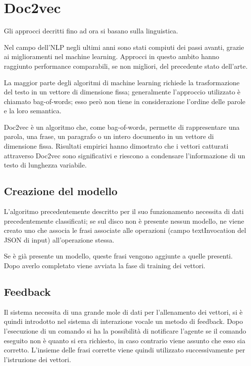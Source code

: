\documentclass[twoside]{supsistudent}
\begin{document}
\section{Doc2vec}
Gli approcci decritti fino ad ora si basano sulla linguistica.

Nel campo dell'NLP negli ultimi anni sono stati compiuti dei passi avanti, grazie ai miglioramenti nel machine learning. Approcci in questo ambito hanno raggiunto performance comparabili, se non migliori, del precedente stato dell'arte. 

La maggior parte degli algoritmi di machine learning richiede la trasformazione del testo in un vettore di dimensione fissa; generalmente l'approccio utilizzato è chiamato bag-of-words; esso però non tiene in considerazione l'ordine delle parole e la loro semantica.\cite{bow}

Doc2vec è un algoritmo che, come bag-of-words, permette di  rappresentare una parola, una frase, un paragrafo o un intero documento in un vettore di dimensione fissa. Risultati empirici hanno dimostrato che i vettori catturati attraverso Doc2vec sono significativi e riescono a condensare l'informazione di un testo di lunghezza variabile.\cite{doc2vec}
\subsection{Creazione del modello}
L'algoritmo precedentemente descritto per il suo funzionamento necessita di dati precedentemente classificati; se sul disco non è presente nessun modello, ne viene creato uno che associa le frasi associate alle operazioni (campo textInvocation del JSON di input) all'operazione stessa. 

Se è già presente un modello, queste frasi vengono aggiunte a quelle presenti. Dopo averlo completato viene avviata la fase di training dei vettori.
\subsection{Feedback}
Il sistema necessita di una grande mole di dati per l'allenamento dei vettori, si è quindi introdotto nel sistema di interazione vocale un metodo di feedback. Dopo l'esecuzione di un comando si ha la possibilità di notificare l'agente se il comando eseguito non è quanto si era richiesto, in caso contrario viene assunto che esso sia corretto. L'insieme delle frasi corrette viene quindi utilizzato successivamente per l'istruzione dei vettori.
\end{document}
